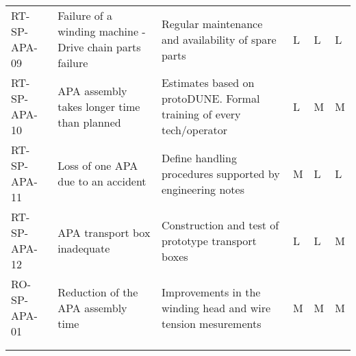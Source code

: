 \begin{footnotesize}
\begin{longtable}{P{0.18\textwidth}P{0.20\textwidth}P{0.32\textwidth}P{0.02\textwidth}P{0.02\textwidth}P{0.02\textwidth}}
RT-SP-APA-09 & Failure of a winding machine - Drive chain parts failure & Regular maintenance and availability of spare parts & L & L & L \\  \colhline
RT-SP-APA-10 & APA assembly takes longer time than planned  & Estimates based on protoDUNE. Formal training of every tech/operator & L & M & M \\  \colhline
RT-SP-APA-11 & Loss of one APA due to an accident & Define handling procedures supported by engineering notes & M & L & L \\  \colhline
RT-SP-APA-12 & APA transport box inadequate & Construction and test of prototype transport boxes & L & L & M \\  \colhline
RO-SP-APA-01 & Reduction of the APA assembly time & Improvements in the winding head and wire tension mesurements & M & M & M \\  
 &  &  &  &  &  \\  \colhline

\label{tab:risks:SP-FD-APA}
\end{longtable}
\end{footnotesize}
